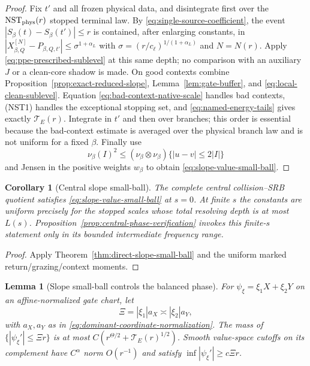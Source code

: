 \documentclass[11pt]{article}
\newtheorem{lemma}[theorem]{Lemma}
\newtheorem{corollary}[theorem]{Corollary}
\begin{document}
\begin{proof}
Fix $t'$ and all frozen physical data, and disintegrate first over the
$\mathrm{NST}_{\rm phys}(r)$ stopped terminal law.  By
\eqref{eq:single-source-coefficient}, the event
$|S_\beta(t)-S_\beta(t')|\le r$ is contained, after enlarging constants, in
 $|X^{[N]}_{\beta,Q}-P_{\beta,Q,t'}|\le\sigma^{1+\alpha_L}$ with
$\sigma=(r/c_\ell)^{1/(1+\alpha_L)}$ and $N=N(r)$.  Apply
\eqref{eq:ppe-prescribed-sublevel} at this same depth; no comparison with an
auxiliary $J$ or a clean-core shadow is made.  On good contexts combine
Proposition~\ref{prop:exact-reduced-slope}, Lemma~\ref{lem:gate-buffer}, and
\eqref{eq:local-clean-sublevel}.  Equation \eqref{eq:bad-context-native-scale}
handles bad contexts, \textup{(NST1)} handles the exceptional stopping set,
and \eqref{eq:named-energy-tails} gives exactly $\mathcal T_E(r)$.  Integrate in
$t'$ and then over branches; this order is essential because the bad-context
estimate is averaged over the physical branch law and is not uniform for a
fixed $\beta$.  Finally use
\[
 \nu_\beta(I)^2\le
 (\nu_\beta\otimes\nu_\beta)\{|u-v|\le2|I|\}
\]
and Jensen in the positive weights $w_\beta$ to obtain
\eqref{eq:slope-value-small-ball}.
\end{proof}

\begin{corollary}[Central slope small-ball]
\label{cor:central-g2}
The complete central collision--SRB quotient satisfies
\eqref{eq:slope-value-small-ball} at $s=0$.  At finite $s$ the constants are
uniform precisely for the stopped scales whose total resolving depth is at
most $L(s)$.  Proposition~\ref{prop:central-phase-verification} invokes this
finite-$s$ statement only in its bounded intermediate frequency range.
\end{corollary}

\begin{proof}
Apply Theorem~\ref{thm:direct-slope-small-ball} and the uniform marked
return/grazing/context moments.
\end{proof}

\begin{lemma}[Slope small-ball controls the balanced phase]
\label{lem:slope-good-bad-phase}
For $\psi_\xi=\xi_1X+\xi_2Y$ on an affine-normalized gate chart, let
\begin{equation}
\label{eq:balanced-physical-frequency}
 \Xi=|\xi_1|a_X\asymp|\xi_2|a_Y,
\end{equation}
with $a_X,a_Y$ as in \eqref{eq:dominant-coordinate-normalization}.  The mass of
$\{|\psi_\xi'|\le\Xi r\}$ is at most
$C(r^{\Theta/2}+\mathcal T_E(r)^{1/2})$.  Smooth value-space cutoffs on its complement have
$C^\alpha$ norm $O(r^{-1})$ and satisfy
$\inf|\psi_\xi'|\ge c\Xi r$.
\end{lemma}
\end{document}
